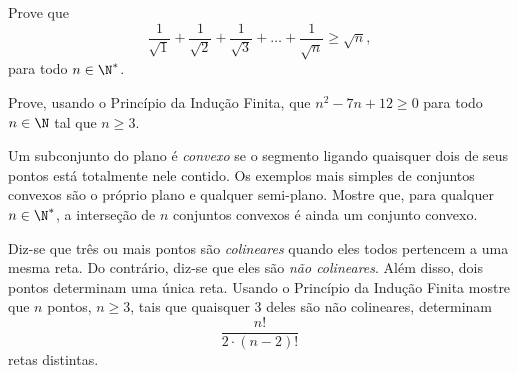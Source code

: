 \begin{exercise}
Prove que
$$\frac 1 {\sqrt 1} +\frac 1 {\sqrt 2} +\frac 1 {\sqrt 3} + \dots + \frac 1 {\sqrt n} \geq \sqrt n,$$
para todo $ n \in \N^*$.
\end{exercise}

\begin{exercise}\label{exercicio:polinomio}
	Prove, usando o Princípio da Indução Finita, que $n^2 - 7n +12 \geq 0$ para todo $n \in \N$ tal que $n \geq 3$.
\end{exercise}

\begin{exercise}
Um subconjunto do plano é \emph{convexo} se o segmento ligando quaisquer dois de seus pontos está totalmente nele contido.
Os exemplos mais simples de conjuntos convexos são o próprio plano e qualquer semi-plano.
Mostre que, para qualquer $n \in \N^*$, a interseção de $n$ conjuntos convexos é ainda um conjunto convexo.
\end{exercise}

\begin{exercise}
Diz-se que três ou mais pontos são \emph{colineares} quando eles todos pertencem a uma mesma reta.
Do contrário, diz-se que eles são \emph{não colineares}.
Além disso, dois pontos determinam uma única reta.
Usando o Princípio da Indução Finita mostre que $n$ pontos, $n\geq 3$, tais que quaisquer 3 deles são não colineares, determinam
$$\frac{n!}{2\cdot(n-2)!}$$
retas distintas.
\end{exercise}